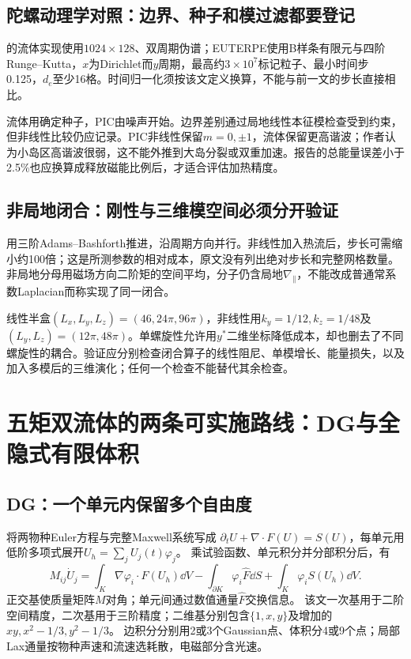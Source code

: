 \documentclass[UTF8,a4paper,11pt,openany,fontset=fandol]{ctexbook}
\begin{document}
\subsection{陀螺动理学对照：边界、种子和模过滤都要登记}
\citet{E475}的流体实现使用$1024\times128$、双周期伪谱；EUTERPE使用B样条有限元与四阶Runge--Kutta，$x$为Dirichlet而$y$周期，最高约$3\times10^7$标记粒子、最小时间步0.125，$d_e$至少16格。时间归一化须按该文定义换算，不能与前一文的步长直接相比。

流体用确定种子，PIC由噪声开始。边界差别通过局地线性本征模检查受到约束，但非线性比较仍应记录。PIC非线性保留$m=0,\pm1$，流体保留更高谐波；作者认为小岛区高谐波很弱，这不能外推到大岛分裂或双重加速。报告的总能量误差小于2.5\%也应换算成释放磁能比例后，才适合评估加热精度。

\subsection{非局地闭合：刚性与三维模空间必须分开验证}
\citet{L244}用三阶Adams--Bashforth推进，沿周期方向并行。非线性加入热流后，步长可需缩小约100倍；这是所测参数的相对成本，原文没有列出绝对步长和完整网格数量。非局地分母用磁场方向二阶矩的空间平均，分子仍含局地$\nabla_\parallel$，不能改成普通常系数Laplacian而称实现了同一闭合。

线性半盒$(L_x,L_y,L_z)=(46,24\pi,96\pi)$，非线性用$k_y=1/12,k_z=1/48$及$(L_y,L_z)=(12\pi,48\pi)$。单螺旋性允许用$y^*$二维坐标降低成本，却也删去了不同螺旋性的耦合。验证应分别检查闭合算子的线性阻尼、单模增长、能量损失，以及加入多模后的三维演化；任何一个检查不能替代其余检查。

\section{五矩双流体的两条可实施路线：DG与全隐式有限体积}
\subsection{DG：一个单元内保留多个自由度}
\citet{L156}将两物种Euler方程与完整Maxwell系统写成
$\partial_tU+\nabla\cdot F(U)=S(U)$，每单元用低阶多项式展开$U_h=\sum_jU_j(t)\varphi_j$。
乘试验函数、单元积分并分部积分后，有
\begin{equation}
 M_{ij}\dot U_j=\int_K\nabla\varphi_i\cdot F(U_h)\dd V
 -\int_{\partial K}\varphi_i\widehat F\dd S+\int_K\varphi_iS(U_h)\dd V.
\end{equation}
正交基使质量矩阵$M$对角；单元间通过数值通量$\widehat F$交换信息。
该文一次基用于二阶空间精度，二次基用于三阶精度；二维基分别包含$\{1,x,y\}$及增加的$xy,x^2-1/3,y^2-1/3$。
边积分分别用2或3个Gaussian点、体积分4或9个点；局部Lax通量按物种声速和流速选耗散，电磁部分含光速。
\end{document}
